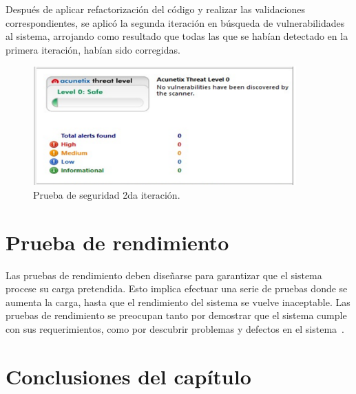 Después de aplicar refactorización del código y realizar las validaciones correspondientes, se aplicó la segunda iteración en búsqueda de vulnerabilidades al sistema, arrojando como resultado que todas las que se
habían detectado en la primera iteración, habían sido corregidas.

\begin{figure}[htbp] %
	\centering
	\includegraphics[width=0.9\textwidth]{images/2iter.PNG} 
	\caption{ Prueba de seguridad 2da iteración.}
	\label{fig:grafica_segu2}
\end{figure}

\section{Prueba de rendimiento}

Las pruebas de rendimiento deben diseñarse para garantizar que el sistema procese su carga pretendida. Esto
implica efectuar una serie de pruebas donde se aumenta la carga, hasta que el rendimiento del sistema se
vuelve inaceptable. Las pruebas de rendimiento se preocupan tanto por demostrar que el sistema cumple
con sus requerimientos, como por descubrir problemas y defectos en el sistema~\cite{sommerville2011software}.


\section*{Conclusiones del capítulo}
